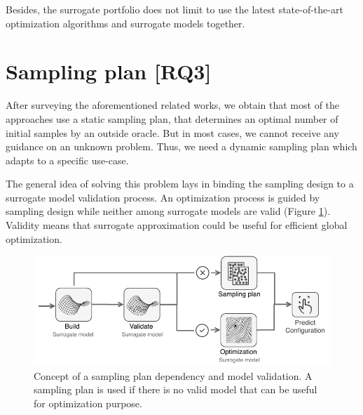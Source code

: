 
            Besides, the surrogate portfolio does not limit to use the latest state-of-the-art optimization algorithms and surrogate models together. 

    \section{Sampling plan [RQ3]}
        After surveying the aforementioned related works, we obtain that most of the approaches use a static sampling plan, that determines an optimal number of initial samples by an outside oracle. 
        But in most cases, we cannot receive any guidance on an unknown problem. Thus, we need a dynamic sampling plan which adapts to a specific use-case.

        The general idea of solving this problem lays in binding the sampling design to a surrogate model validation process. An optimization process is guided by sampling design while neither among surrogate models are valid (Figure \ref{fig:concept_sampling}). Validity means that surrogate approximation could be useful for efficient global optimization.

        \begin{figure}[h!]
            \centering
            \includegraphics[width=\textwidth]{content/images/dinamic_sampling_plan}
            \caption[Non-dominated points]{Concept of a sampling plan dependency and model validation. A sampling plan is used if there is no valid model that can be useful for optimization purpose.} 
            \label{fig:concept_sampling} 
        \end{figure}      

